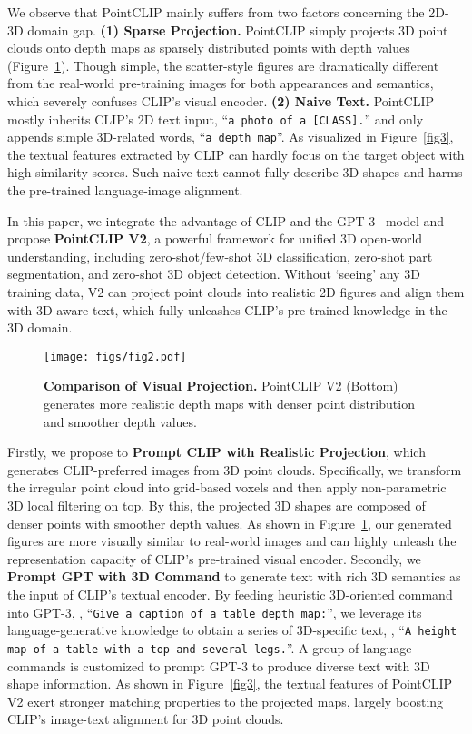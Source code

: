 \documentclass[10pt,twocolumn,letterpaper]{article}
\begin{document}
We observe that PointCLIP mainly suffers from two factors concerning the 2D-3D domain gap. \textbf{(1) Sparse Projection.} PointCLIP simply projects 3D point clouds onto depth maps as sparsely distributed points with depth values (Figure~\ref{fig2}). Though simple, the scatter-style figures are dramatically different from the real-world pre-training images for both appearances and semantics, which severely confuses CLIP's visual encoder. \textbf{(2) Naive Text.} PointCLIP mostly inherits CLIP's 2D text input, ``\texttt{a photo of a {[CLASS]}.}'' and only appends simple 3D-related words, ``\texttt{a depth map}''. As visualized in Figure~\ref{fig3}, the textual features extracted by CLIP can hardly focus on the target object with high similarity scores. Such naive text cannot fully describe 3D shapes and harms the pre-trained language-image alignment. 

In this paper, we integrate the advantage of CLIP and the GPT-3~\cite{brown2020language} model and propose \textbf{PointCLIP V2}, a powerful framework for unified 3D open-world understanding, including zero-shot/few-shot 3D classification, zero-shot part segmentation, and zero-shot 3D object detection.
Without `seeing' any 3D training data, V2 can project point clouds into realistic 2D figures and align them with 3D-aware text, which fully unleashes CLIP's pre-trained knowledge in the 3D domain.

\begin{figure}[t!]
\centering
\texttt{[image: figs/fig2.pdf]}
\caption{\textbf{Comparison of Visual Projection.} PointCLIP V2 (Bottom) generates more realistic depth maps with denser point distribution and smoother depth values.}
\label{fig2}
\vspace{-0.31cm}
\end{figure}

Firstly, we propose to \textbf{Prompt CLIP with Realistic Projection}, which generates CLIP-preferred images from 3D point clouds. Specifically, we transform the irregular point cloud into grid-based voxels and then apply non-parametric 3D local filtering on top. By this, the projected 3D shapes are composed of denser points with smoother depth values. As shown in Figure~\ref{fig2}, our generated figures are more visually similar to real-world images and can highly unleash the representation capacity of CLIP's pre-trained visual encoder.
Secondly, we \textbf{Prompt GPT with 3D Command} to generate text with rich 3D semantics as the input of CLIP's textual encoder. By feeding heuristic 3D-oriented command into GPT-3, \eg, ``\texttt{Give a caption of a table depth map:}'', we leverage its language-generative knowledge to obtain a series of 3D-specific text, \eg, ``\texttt{A height map of a table with a top and several legs.}''. A group of language commands is customized to prompt GPT-3 to produce diverse text with 3D shape information.
As shown in Figure~\ref{fig3}, the textual features of PointCLIP V2 exert stronger matching properties to the projected maps, largely boosting CLIP's image-text alignment for 3D point clouds.
\end{document}

